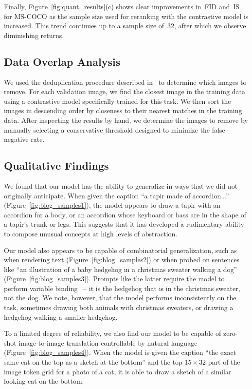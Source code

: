\documentclass{article}
\begin{document}
Finally, Figure~\ref{fig:quant_results}(c) shows clear improvements in~FID and~IS for MS-COCO as the sample size used for reranking with the contrastive model is increased. This trend continues up to a sample size of~32, after which we observe diminishing returns.

\subsection{Data Overlap Analysis}
\label{sec:data_overlap_analysis}

We used the deduplication procedure described in~\citet{radford2021learning} to determine which images to remove. For each validation image, we find the closest image in the training data using a contrastive model specifically trained for this task. We then sort the images in descending order by closeness to their nearest matches in the training data. After inspecting the results by hand, we determine the images to remove by manually selecting a conservative threshold designed to minimize the false negative rate.

\subsection{Qualitative Findings}
\label{sec:qual_findings}

We found that our model has the ability to generalize in ways that we did not originally anticipate. When given the caption ``a tapir made of accordion...'' (Figure~\ref{fig:blog_samples1}), the model appears to draw a tapir with an accordion for a body, or an accordion whose keyboard or bass are in the shape of a tapir's trunk or legs. This suggests that it has developed a rudimentary ability to compose unusual concepts at high levels of abstraction.

Our model also appears to be capable of combinatorial generalization, such as when rendering text (Figure~\ref{fig:blog_samples2}) or when probed on sentences like ``an illustration of a baby hedgehog in a christmas sweater walking a dog'' (Figure~\ref{fig:blog_samples3}). Prompts like the latter require the model to perform variable binding~\cite{smolensky1990tensor,greff2020binding} -- it is the hedgehog that is in the christmas sweater, not the dog. We note, however, that the model performs inconsistently on the task, sometimes drawing both animals with christmas sweaters, or drawing a hedgehog walking a smaller hedgehog.

To a limited degree of reliability, we also find our model to be capable of zero-shot image-to-image translation controllable by natural language (Figure~\ref{fig:blog_samples4}). When the model is given the caption ``the exact same cat on the top as a sketch at the bottom'' and the top $15 \times 32$ part of the image token grid for a photo of a cat, it is able to draw a sketch of a similar looking cat on the bottom. 
\end{document}
